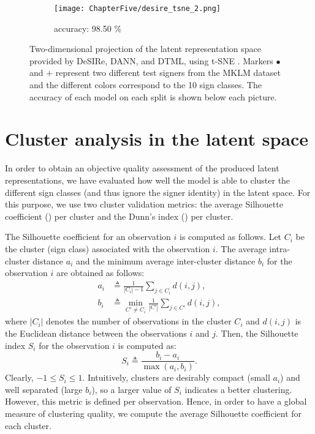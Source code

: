 \begin{figure}[ht!]
\begin{minipage}[t!]{0.985\textwidth}
\begin{subfigure}{0.325\textwidth}
            \centering
            \texttt{[image: ChapterFive/desire\_tsne\_2.png]}
            \caption{accuracy: 98.50 \%}
        \end{subfigure}
    \end{minipage}
    \caption{Two-dimensional projection of the latent representation space provided by DeSIRe, DANN, and DTML, using t-SNE \cite{Maaten2008}. Markers $\bullet$ and $\textbf{+}$ represent two different test signers from the MKLM dataset and the different colors correspond to the 10 sign classes. The accuracy of each model on each split is shown below each picture.}
    \label{fig:desire_tsne_b}
\end{figure}

\section{Cluster analysis in the latent space}
\label{sec:desire_clusters}
In order to obtain an objective quality assessment of the produced latent representations, we have evaluated how well the model is able to cluster the different sign classes (and thus ignore the signer identity) in the latent space. For this purpose, we use two cluster validation metrics: the average Silhouette coefficient (\citet{Rousseeuw1987}) per cluster and the Dunn's index (\citet{Dunn1973}) per cluster.

The Silhouette coefficient for an observation $i$ is computed as follows. Let $C_i$ be the cluster (sign class) associated with the observation $i$. The average intra-cluster distance $a_i$ and the minimum average inter-cluster distance $b_i$ for the observation $i$ are obtained as follows:
\begin{align}
    a_i &\triangleq \frac{1}{|C_i|-1} \sum_{j \in C_i} d(i,j),\\
    b_i &\triangleq \min_{C' \neq C_i} \frac{1}{|C'|} \sum_{j \in C'} d(i,j),
\end{align}
where $|C_i|$ denotes the number of observations in the cluster $C_i$ and $d(i,j)$ is the Euclidean distance between the observations $i$ and $j$. Then, the Silhouette index $S_i$ for the observation $i$ is computed as:
\begin{equation}
    S_i \triangleq \frac{b_i - a_i}{\max(a_i, b_i)}.
\end{equation}
Clearly, $-1 \leq S_i \leq 1$. Intuitively, clusters are desirably compact (small $a_i$) and well separated (large $b_i$), so a larger value of $S_i$ indicates a better clustering. However, this metric is defined per observation. Hence, in order to have a global measure of clustering quality, we compute the average Silhouette coefficient for each cluster.

